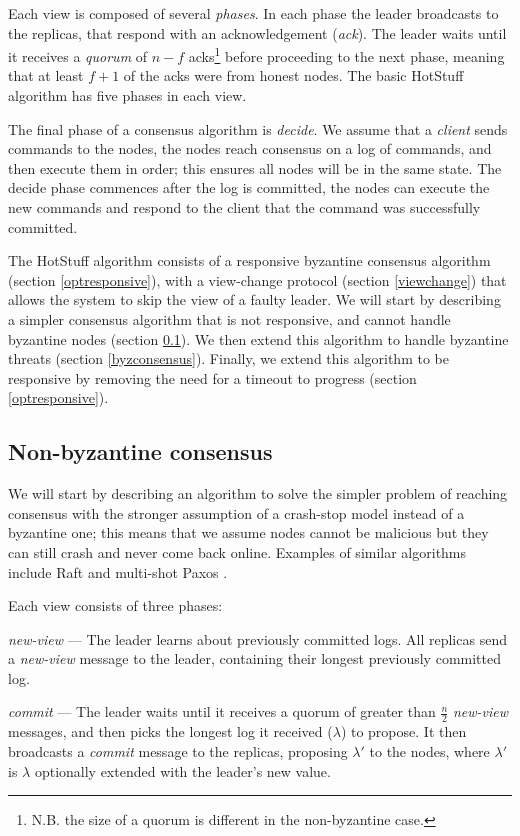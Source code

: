 Each view is composed of several \textit{phases}. In each phase the leader broadcasts to the replicas, that respond with an acknowledgement (\textit{ack}). The leader waits until it receives a \textit{quorum} of $n - f$ acks\footnote{N.B. the size of a quorum is different in the non-byzantine case.} before proceeding to the next phase, meaning that at least $f + 1$ of the acks were from honest nodes. The basic HotStuff algorithm has five phases in each view.

The final phase of a consensus algorithm is \textit{decide}. We assume that a \textit{client} sends commands to the nodes, the nodes reach consensus on a log of commands, and then execute them in order; this ensures all nodes will be in the same state. The decide phase commences after the log is committed, the nodes can execute the new commands and respond to the client that the command was successfully committed.

The HotStuff algorithm consists of a responsive byzantine consensus algorithm (section \ref{optresponsive}), with a view-change protocol (section \ref{viewchange}) that allows the system to skip the view of a faulty leader. We will start by describing a simpler consensus algorithm that is not responsive, and cannot handle byzantine nodes (section \ref{nonbyzconsensus}). We then extend this algorithm to handle byzantine threats (section \ref{byzconsensus}). Finally, we extend this algorithm to be responsive by removing the need for a timeout to progress (section \ref{optresponsive}).

\subsection{Non-byzantine consensus} \label{nonbyzconsensus}
We will start by describing an algorithm to solve the simpler problem of reaching consensus with the stronger assumption of a crash-stop model instead of a byzantine one; this means that we assume nodes cannot be malicious but they can still crash and never come back online. Examples of similar algorithms include Raft \cite{ongaro_search_nodate} and multi-shot Paxos \cite{lamport_part-time_1998}\cite{lamport_paxos_2001}.

Each view consists of three phases:

\textit{new-view} --- The leader learns about previously committed logs. All replicas send a \textit{new-view} message to the leader, containing their longest previously committed log.

\textit{commit} --- The leader waits until it receives a quorum of greater than $\frac{n}{2}$ \textit{new-view} messages, and then picks the longest log it received ($\lambda$) to propose. It then broadcasts a \textit{commit} message to the replicas, proposing $\lambda'$ to the nodes, where $\lambda'$ is $\lambda$ optionally extended with the leader's new value.

